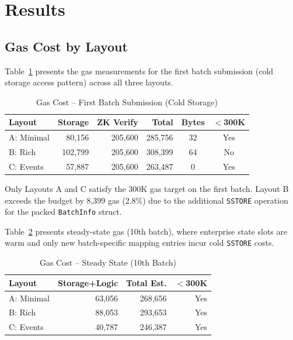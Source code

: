 \section{Results}
\label{sec:results}

\subsection{Gas Cost by Layout}

Table~\ref{tab:gas-first-batch} presents the gas measurements for the first batch
submission (cold storage access pattern) across all three layouts.

\begin{table}[htbp]
\centering
\caption{Gas Cost -- First Batch Submission (Cold Storage)}
\label{tab:gas-first-batch}
\small
\begin{tabular}{@{}lrrrcc@{}}
\toprule
\textbf{Layout} & \textbf{Storage} & \textbf{ZK Verify} & \textbf{Total} & \textbf{Bytes} & \textbf{$<$300K} \\
\midrule
A: Minimal   & 80,156  & 205,600 & 285,756 & 32 & Yes \\
B: Rich      & 102,799 & 205,600 & 308,399 & 64 & No \\
C: Events    & 57,887  & 205,600 & 263,487 & 0  & Yes \\
\bottomrule
\end{tabular}
\end{table}

Only Layouts A and C satisfy the 300K gas target on the first batch. Layout B exceeds the
budget by 8,399 gas (2.8\%) due to the additional \texttt{SSTORE} operation for the packed
\texttt{BatchInfo} struct.

Table~\ref{tab:gas-steady-state} presents steady-state gas (10th batch), where enterprise
state slots are warm and only new batch-specific mapping entries incur cold
\texttt{SSTORE} costs.

\begin{table}[htbp]
\centering
\caption{Gas Cost -- Steady State (10th Batch)}
\label{tab:gas-steady-state}
\small
\begin{tabular}{@{}lrrr@{}}
\toprule
\textbf{Layout} & \textbf{Storage+Logic} & \textbf{Total Est.} & \textbf{$<$300K} \\
\midrule
A: Minimal   & 63,056 & 268,656 & Yes \\
B: Rich      & 88,053 & 293,653 & Yes \\
C: Events    & 40,787 & 246,387 & Yes \\
\bottomrule
\end{tabular}
\end{table}


